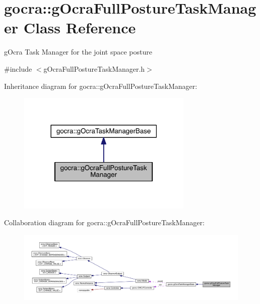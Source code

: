 \hypertarget{classgocra_1_1gOcraFullPostureTaskManager}{}\section{gocra\+:\+:g\+Ocra\+Full\+Posture\+Task\+Manager Class Reference}
\label{classgocra_1_1gOcraFullPostureTaskManager}


g\+Ocra Task Manager for the joint space posture  




{\ttfamily \#include $<$g\+Ocra\+Full\+Posture\+Task\+Manager.\+h$>$}



Inheritance diagram for gocra\+:\+:g\+Ocra\+Full\+Posture\+Task\+Manager\+:\nopagebreak
\begin{figure}[H]
\begin{center}
\leavevmode
\includegraphics[width=237pt]{dc/d1b/classgocra_1_1gOcraFullPostureTaskManager__inherit__graph}
\end{center}
\end{figure}


Collaboration diagram for gocra\+:\+:g\+Ocra\+Full\+Posture\+Task\+Manager\+:
\nopagebreak
\begin{figure}[H]
\begin{center}
\leavevmode
\includegraphics[width=350pt]{dc/dfa/classgocra_1_1gOcraFullPostureTaskManager__coll__graph}
\end{center}
\end{figure}
